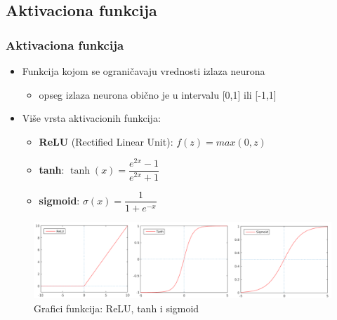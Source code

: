 \documentclass{beamer}
\begin{document}
\subsection{Aktivaciona funkcija}
\begin{frame}
\frametitle{Aktivaciona funkcija}

\begin{itemize}
\item Funkcija kojom se ograničavaju vrednosti izlaza neurona
\begin{itemize}
\item opseg izlaza neurona obično je u intervalu [0,1] ili [-1,1]
\end{itemize}
\item Više vrsta aktivacionih funkcija:
\begin{itemize}
\item \textbf{ReLU} (Rectified Linear Unit): $f(z)=max(0, z)$
\item \textbf{tanh}: $\tanh(x) = \dfrac{e^{2x}-1}{e^{2x}+1}$
\item \textbf{sigmoid}: $\sigma(x) = \dfrac{1}{1 + e^{-x}}$
\end{itemize}
\end{itemize}


\begin{figure}
\includegraphics[scale=0.38]{graphs_prez.png}
\caption{Grafici funkcija: ReLU, tanh i sigmoid}
\end{figure}

\end{frame}
\end{document}
